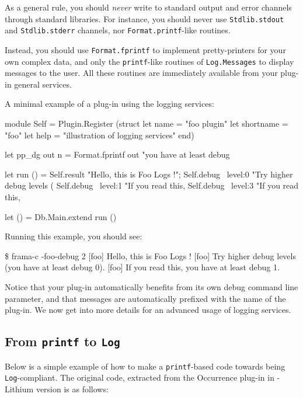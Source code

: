 As a general rule, you should \emph{never} write to standard output
and error channels through \ocaml standard libraries. For instance,
you should never use \texttt{Stdlib.stdout} and
\texttt{Stdlib.stderr} channels, nor \texttt{Format.printf}-like
routines.

Instead, you should use \texttt{Format.fprintf} to implement
pretty-printers for your own complex data, and only the
\texttt{printf}-like routines of
\texttt{Log.Messages} to display messages to
the user. All these routines are immediately available from your
plug-in general services.

\begin{example}
A minimal example of a plug-in using the logging services:
\begin{ocamlcode}
module Self = Plugin.Register
  (struct
     let name = "foo plugin"
     let shortname = "foo"
     let help = "illustration of logging services"
   end)

let pp_dg out n =
  Format.fprintf out
    "you have at least debug %

let run () =
  Self.result "Hello, this is Foo Logs !";
  Self.debug ~level:0 "Try higher debug levels (%
  Self.debug ~level:1 "If you read this, %
  Self.debug ~level:3 "If you read this, %

let () = Db.Main.extend run ()
\end{ocamlcode}
\end{example}

Running this example, you should see:
\begin{shell}
\$ frama-c -foo-debug 2
[foo] Hello, this is Foo Logs !
[foo] Try higher debug levels (you have at least debug 0).
[foo] If you read this, you have at least debug 1.
\end{shell}

Notice that your plug-in automatically benefits from its own debug
command line parameter, and that messages are automatically prefixed
with the name of the plug-in. We now get into more details for an
advanced usage of logging services.

\subsection{From \texttt{printf} to \texttt{Log}}

Below is a simple example of how to make a \texttt{printf}-based code
towards being \texttt{Log}-compliant. The original code, extracted
from the \textsf{Occurrence} plug-in in \framac-\textsf{Lithium}
version is as follows:

